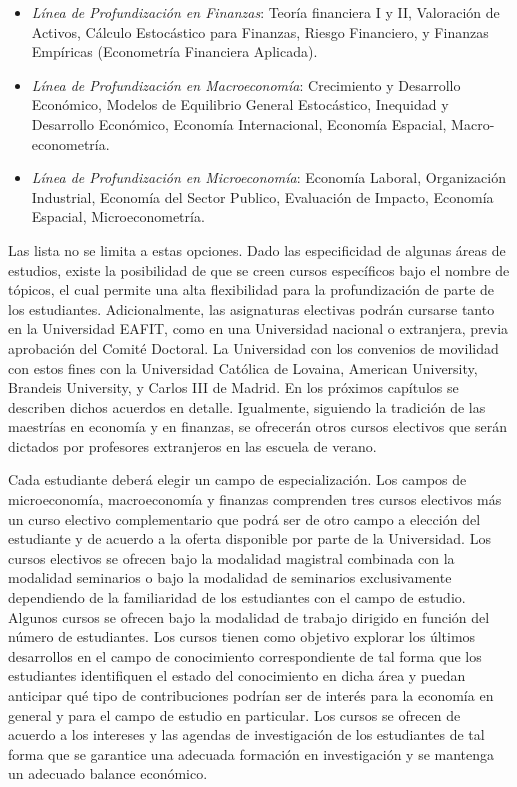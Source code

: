 \begin{itemize}
\item 	\emph{Línea de Profundización en Finanzas}: Teoría financiera I y II, Valoración de Activos, Cálculo Estocástico para Finanzas, Riesgo Financiero, y Finanzas Empíricas (Econometría Financiera Aplicada).
\item 	\emph{Línea de Profundización en Macroeconomía}: Crecimiento y Desarrollo Económico, Modelos de Equilibrio General Estocástico, Inequidad y Desarrollo Económico, Economía Internacional, Economía Espacial, Macro-econometría.
\item 	\emph{Línea de Profundización en Microeconomía}: Economía Laboral, Organización Industrial, Economía del Sector Publico, Evaluación de Impacto, Economía Espacial, Microeconometría.
\end{itemize}

Las lista no se limita a estas opciones. Dado las especificidad de algunas áreas de estudios, existe la posibilidad de que se creen cursos específicos bajo el nombre de tópicos, el cual permite una alta flexibilidad para la profundización de parte de los estudiantes. Adicionalmente, las asignaturas electivas podrán cursarse tanto en la Universidad EAFIT, como en una Universidad nacional o extranjera, previa aprobación del Comité Doctoral. La Universidad con los convenios de movilidad con estos fines con la Universidad Católica de Lovaina, American University, Brandeis University, y Carlos III de Madrid. En los próximos capítulos se describen dichos acuerdos en detalle. Igualmente, siguiendo la tradición de las maestrías en economía y en finanzas, se ofrecerán otros cursos electivos que serán dictados por profesores extranjeros en las escuela de verano.

Cada estudiante deberá elegir un campo de especialización. Los campos de microeconomía, macroeconomía y finanzas comprenden tres cursos electivos más un curso electivo complementario que podrá ser de otro campo a elección del estudiante y de acuerdo a la oferta disponible por parte de la Universidad.  Los cursos electivos se ofrecen bajo la modalidad magistral combinada con la modalidad seminarios o bajo la modalidad de seminarios exclusivamente dependiendo de la familiaridad de los estudiantes con el campo de estudio. Algunos cursos se ofrecen bajo la modalidad de trabajo dirigido en función del número de estudiantes. Los cursos tienen como objetivo explorar los últimos desarrollos en el campo de conocimiento correspondiente de tal forma que los estudiantes identifiquen el estado del conocimiento en dicha área y puedan anticipar qué tipo de contribuciones podrían ser de interés para la economía en general y para el campo de estudio en particular. Los cursos se ofrecen de acuerdo a los intereses y las agendas de investigación de los estudiantes de tal forma que se garantice una adecuada formación en investigación y se mantenga un adecuado balance económico. 

